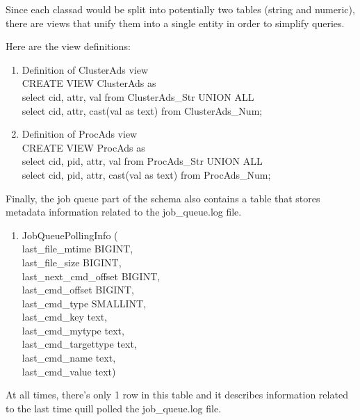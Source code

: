 \begin{enumerate}
Since each classad would be split into potentially two tables (string
and numeric), there are views that unify them into a single entity in
order to simplify queries.

Here are the view definitions:

\begin{enumerate}
\item Definition of ClusterAds view\\
     CREATE VIEW ClusterAds as\\
        select cid, attr, val from ClusterAds\_Str UNION ALL\\
        select cid, attr, cast(val as text) from ClusterAds\_Num;


\item Definition of ProcAds view\\
     CREATE VIEW ProcAds as\\
        select cid, pid, attr, val from ProcAds\_Str UNION ALL\\
        select cid, pid, attr, cast(val as text) from ProcAds\_Num;
\end{enumerate}

Finally, the job queue part of the schema also contains a table that
stores metadata information related to the job\_queue.log file.

\begin{enumerate}
\item JobQueuePollingInfo (\\
        last\_file\_mtime         BIGINT,\\
        last\_file\_size          BIGINT,\\
        last\_next\_cmd\_offset    BIGINT,\\
        last\_cmd\_offset         BIGINT,\\
        last\_cmd\_type           SMALLINT,\\
        last\_cmd\_key            text,\\
        last\_cmd\_mytype         text,\\
        last\_cmd\_targettype     text,\\
        last\_cmd\_name           text,\\
        last\_cmd\_value          text)
\end{enumerate}
	
At all times, there's only 1 row in this table and it describes
information related to the last time quill polled the job\_queue.log file.


\end{enumerate}
